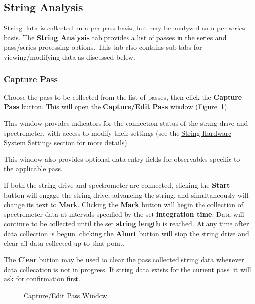 \documentclass[10pt,letterpaper,titlepage]{article}
\begin{document}
    \subsection{String Analysis}
    String data is collected on a per-pass basis, but may be analyzed on a per-series basis. The \textbf{String Analysis} tab provides a list of passes in the series and pass/series processing options. This tab also contains sub-tabs for viewing/modifying data as discussed below.
    
    \subsubsection{Capture Pass}
    Choose the pass to be collected from the list of passes, then click the \textbf{Capture Pass} button. This will open the \textbf{Capture/Edit Pass} window (Figure~\ref{fig:capture_edit_pass}).\par
    This window provides indicators for the connection status of the string drive and spectrometer, with access to modify their settings (see the \hyperref[sec:string_hardware_settings]{String Hardware System Settings} section for more details).\par
    This window also provides optional data entry fields for observables specific to the applicable pass.\par
    If both the string drive and spectrometer are connected, clicking the \textbf{Start} button will engage the string drive, advancing the string, and simultaneously will change its text to \textbf{Mark}. Clicking the \textbf{Mark} button will begin the collection of spectrometer data at intervals specified by the set \textbf{integration time}. Data will continue to be collected until the set \textbf{string length} is reached. At any time after data collection is begun, clicking the \textbf{Abort} button will stop the string drive and clear all data collected up to that point.\par
    The \textbf{Clear} button may be used to clear the pass collected string data whenever data collecation is not in progress. If string data exists for the current pass, it will ask for confirmation first.
    \begin{figure}[h]
        \centering
        \caption{Capture/Edit Pass Window}
        \label{fig:capture_edit_pass}
    \end{figure}
    \newpage
\end{document}
